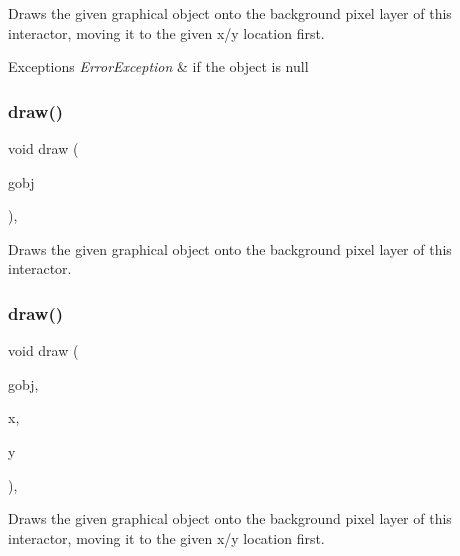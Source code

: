 Draws the given graphical object onto the background pixel layer of this interactor, moving it to the given x/y location first. 


\begin{DoxyExceptions}{Exceptions}
{\em Error\+Exception} & if the object is null \\
\hline
\end{DoxyExceptions}
\mbox{\label{classGDrawingSurface_a022a8d51c7fabcd79a0c809233e93453}} 
\subsubsection{\texorpdfstring{draw()}{draw()}\hspace{0.1cm}{\footnotesize\ttfamily [2/5]}}
{\footnotesize\ttfamily void draw (\begin{DoxyParamCaption}\item[{\mbox{\hyperlink{classGObject}{G\+Object}} \&}]{gobj }\end{DoxyParamCaption})\hspace{0.3cm}{\ttfamily [virtual]}, {\ttfamily [inherited]}}



Draws the given graphical object onto the background pixel layer of this interactor. 

\mbox{\label{classGDrawingSurface_a8af8762bd6720e0a1d2a84b190e3dc96}} 
\subsubsection{\texorpdfstring{draw()}{draw()}\hspace{0.1cm}{\footnotesize\ttfamily [3/5]}}
{\footnotesize\ttfamily void draw (\begin{DoxyParamCaption}\item[{\mbox{\hyperlink{classGObject}{G\+Object}} \&}]{gobj,  }\item[{double}]{x,  }\item[{double}]{y }\end{DoxyParamCaption})\hspace{0.3cm}{\ttfamily [virtual]}, {\ttfamily [inherited]}}



Draws the given graphical object onto the background pixel layer of this interactor, moving it to the given x/y location first. 

